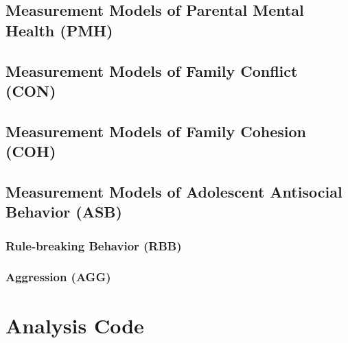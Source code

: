 \documentclass{sn-jnl}                  %
\begin{document}
\begin{appendices}
\subsection{Measurement Models of Parental Mental Health (PMH)}

\subsection{Measurement Models of Family Conflict (CON)}

\subsection{Measurement Models of Family Cohesion (COH)}

\subsection{Measurement Models of Adolescent Antisocial Behavior (ASB)}

\subsubsection{Rule-breaking Behavior (RBB)}

\subsubsection{Aggression (AGG)}

\section{Analysis Code}

\end{appendices}
\end{document}
